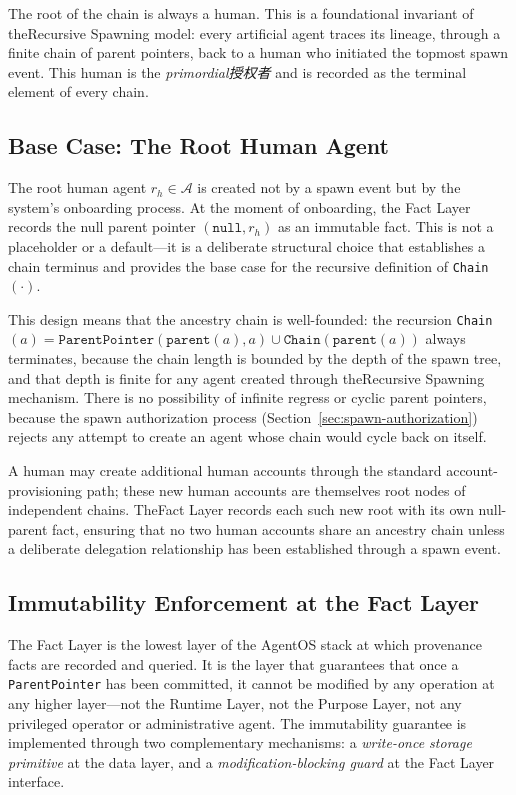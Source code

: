 The root of the chain is always a human. This is a foundational invariant of theRecursive Spawning model: every artificial agent traces its lineage, through a finite chain of parent pointers, back to a human who initiated the topmost spawn event. This human is the \emph{primordial授权者} and is recorded as the terminal element of every chain.

\subsection{Base Case: The Root Human Agent}

The root human agent $r_h \in \mathcal{A}$ is created not by a spawn event but by the system's onboarding process. At the moment of onboarding, the Fact Layer records the null parent pointer $(\texttt{null}, r_h)$ as an immutable fact. This is not a placeholder or a default—it is a deliberate structural choice that establishes a chain terminus and provides the base case for the recursive definition of \texttt{Chain}$(\cdot)$.

This design means that the ancestry chain is well-founded: the recursion \texttt{Chain}$(a) = \texttt{ParentPointer}(\texttt{parent}(a), a) \cup \texttt{Chain}(\texttt{parent}(a))$ always terminates, because the chain length is bounded by the depth of the spawn tree, and that depth is finite for any agent created through theRecursive Spawning mechanism. There is no possibility of infinite regress or cyclic parent pointers, because the spawn authorization process (Section~\ref{sec:spawn-authorization}) rejects any attempt to create an agent whose chain would cycle back on itself.

A human may create additional human accounts through the standard account-provisioning path; these new human accounts are themselves root nodes of independent chains. TheFact Layer records each such new root with its own null-parent fact, ensuring that no two human accounts share an ancestry chain unless a deliberate delegation relationship has been established through a spawn event.

\subsection{Immutability Enforcement at the Fact Layer}

The Fact Layer is the lowest layer of the AgentOS stack at which provenance facts are recorded and queried. It is the layer that guarantees that once a \texttt{ParentPointer} has been committed, it cannot be modified by any operation at any higher layer—not the Runtime Layer, not the Purpose Layer, not any privileged operator or administrative agent. The immutability guarantee is implemented through two complementary mechanisms: a \emph{write-once storage primitive} at the data layer, and a \emph{modification-blocking guard} at the Fact Layer interface.


